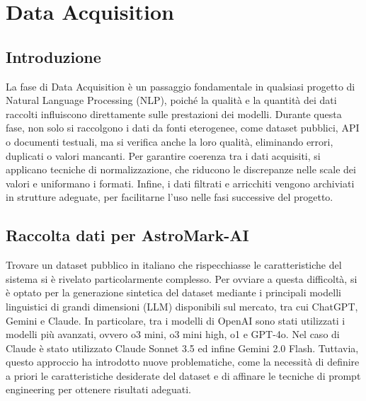 \chapter{Data Acquisition}


\section{Introduzione}
La fase di Data Acquisition è un passaggio fondamentale in qualsiasi progetto di Natural Language Processing (NLP), poiché la qualità e la quantità dei dati raccolti influiscono direttamente sulle prestazioni dei modelli. Durante questa fase, non solo si raccolgono i dati da fonti eterogenee, come dataset pubblici, API o documenti testuali, ma si verifica anche la loro qualità, eliminando errori, duplicati o valori mancanti. Per garantire coerenza tra i dati acquisiti, si applicano tecniche di normalizzazione, che riducono le discrepanze nelle scale dei valori e uniformano i formati. Infine, i dati filtrati e arricchiti vengono archiviati in strutture adeguate, per facilitarne l’uso nelle fasi successive del progetto.

\section{Raccolta dati per AstroMark-AI}
Trovare un dataset pubblico in italiano che rispecchiasse le caratteristiche del sistema si è rivelato particolarmente complesso. Per ovviare a questa difficoltà, si è optato per la generazione sintetica del dataset mediante i principali modelli linguistici di grandi dimensioni (LLM) disponibili sul mercato, tra cui ChatGPT, Gemini e Claude. In particolare, tra i modelli di OpenAI sono stati utilizzati i modelli più avanzati, ovvero o3 mini, o3 mini high, o1 e GPT-4o. Nel caso di Claude è stato utilizzato Claude Sonnet 3.5 ed infine Gemini 2.0 Flash. Tuttavia, questo approccio ha introdotto nuove problematiche, come la necessità di definire a priori le caratteristiche desiderate del dataset e di affinare le tecniche di prompt engineering per ottenere risultati adeguati.

